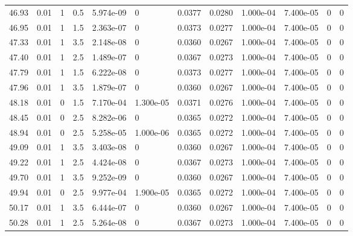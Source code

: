 \documentclass[preview]{standalone}
\begin{document}
{{{{{\begin{tabular}{L{1.2cm}C{1.2cm} C{0.3cm}C{0.5cm} C{1.4cm}C{1.4cm} C{1.4cm}C{1.4cm} C{1.6cm}C{1.6cm} C{1.6cm}C{1.6cm}}
  46.93  &  0.01  & 1     & 0.5 &  5.974e-09  & 0  &  0.0377&   0.0280& 1.000e-04 & 7.400e-05   &  0 & 0  \\ 
  46.95  &  0.01  & 1     & 1.5 &  2.363e-07  & 0  &  0.0373&   0.0277& 1.000e-04 & 7.400e-05   &  0 & 0  \\ 
  47.33  &  0.01  & 1     & 3.5 &  2.148e-08  & 0  &  0.0360&   0.0267& 1.000e-04 & 7.400e-05   &  0 & 0  \\ 
  47.40  &  0.01  & 1     & 2.5 &  1.489e-07  & 0  &  0.0367&   0.0273& 1.000e-04 & 7.400e-05   &  0 & 0  \\ 
  47.79  &  0.01  & 1     & 1.5 &  6.222e-08  & 0  &  0.0373&   0.0277& 1.000e-04 & 7.400e-05   &  0 & 0  \\ 
  47.96  &  0.01  & 1     & 3.5 &  1.879e-07  & 0  &  0.0360&   0.0267& 1.000e-04 & 7.400e-05   &  0 & 0  \\ 
  48.18  &  0.01  & 0     & 1.5 &  7.170e-04  & 1.300e-05  &  0.0371&   0.0276& 1.000e-04 & 7.400e-05   &  0 & 0  \\ 
  48.45  &  0.01  & 0     & 2.5 &  8.282e-06  & 0  &  0.0365&   0.0272& 1.000e-04 & 7.400e-05   &  0 & 0  \\ 
  48.94  &  0.01  & 0     & 2.5 &  5.258e-05  & 1.000e-06  &  0.0365&   0.0272& 1.000e-04 & 7.400e-05   &  0 & 0  \\ 
  49.09  &  0.01  & 1     & 3.5 &  3.403e-08  & 0  &  0.0360&   0.0267& 1.000e-04 & 7.400e-05   &  0 & 0  \\ 
  49.22  &  0.01  & 1     & 2.5 &  4.424e-08  & 0  &  0.0367&   0.0273& 1.000e-04 & 7.400e-05   &  0 & 0  \\ 
  49.70  &  0.01  & 1     & 3.5 &  9.252e-09  & 0  &  0.0360&   0.0267& 1.000e-04 & 7.400e-05   &  0 & 0  \\ 
  49.94  &  0.01  & 0     & 2.5 &  9.977e-04  & 1.900e-05  &  0.0365&   0.0272& 1.000e-04 & 7.400e-05   &  0 & 0  \\ 
  50.17  &  0.01  & 1     & 3.5 &  6.444e-07  & 0  &  0.0360&   0.0267& 1.000e-04 & 7.400e-05   &  0 & 0  \\ 
  50.28  &  0.01  & 1     & 2.5 &  5.264e-08  & 0  &  0.0367&   0.0273& 1.000e-04 & 7.400e-05   &  0 & 0  \\ 
\hline 
\end{tabular} 

}}}}}
\end{document}
